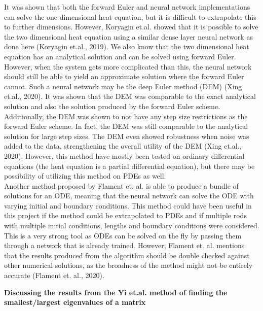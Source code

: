 \documentclass[12pt,a4paper]{article}
\begin{document}
It was shown that both the forward Euler and neural network implementations can solve the one dimensional heat equation, but it is difficult to extrapolate this to further dimensions. However, Koryagin et.al. showed that it is possible to solve the two dimensional heat equation using a similar dense layer neural network as done here (Koryagin et.al., 2019). We also know that the two dimensional heat equation has an analytical solution and can be solved using forward Euler. However, when the system gets more complicated than this, the neural network should still be able to yield an approximate solution where the forward Euler cannot. Such a neural network may be the deep Euler method (DEM) (Xing et.al., 2020). It was shown that the DEM was comparable to the exact analytical solution and also the solution produced by the forward Euler scheme. Additionally, the DEM was shown to not have any step size restrictions as the forward Euler scheme. In fact, the DEM was still comparable to the analytical solution for large step sizes. The DEM even showed robustness when noise was added to the data, strengthening the overall utility of the DEM (Xing et.al., 2020). However, this method have mostly been tested on ordinary differential equations (the heat equation is a partial differential equation), but there may be possibility of utilizing this method on PDEs as well. 
\\
Another method proposed by Flament et. al. is able to produce a bundle of solutions for an ODE, meaning that the neural network can solve the ODE with varying initial and boundary conditions. This method could have been useful in this project if the method could be extrapolated to PDEs and if multiple rods with multiple initial conditions, lengths and boundary conditions were considered. This is a very strong tool as ODEs can be solved on the fly by passing them through a network that is already trained. However, Flament et. al. mentions that the results produced from the algorithm should be double checked against other numerical solutions, as the broadness of the method might not be entirely accurate (Flament et. al., 2020). 

\begin{center}
\large{\textbf{Discussing the results from the Yi et.al. method of finding the smallest/largest eigenvalues of a matrix}}
\end{center}
\end{document}
